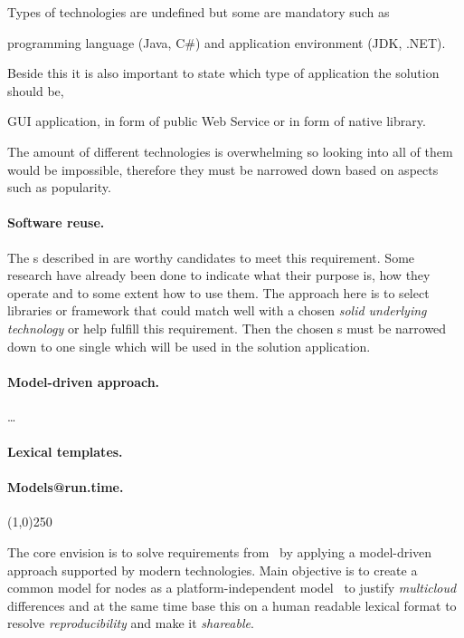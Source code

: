 Types of technologies are undefined but some are mandatory such as 
\begin{ii}
  \iitem programming language (Java, C\#) and 
  \iitem application environment (JDK, .NET).
\end{ii}
Beside this it is also important to state which type of application the solution should be, 
\begin{ii}
  \iitem GUI application,
  \iitem {} in form of public Web Service or
  \iitem {} in form of native library.
\end{ii}
The amount of different technologies is overwhelming so looking into all of them would be impossible,
therefore they must be narrowed down based on aspects such as popularity.

\paragraph{Software reuse.}
The s described in  are worthy candidates to meet this requirement.
Some research have already been done to indicate what their purpose is, 
how they operate and to some extent how to use them.
The approach here is to select libraries or framework that could match well with a chosen
\emph{solid underlying technology} or help fulfill this requirement.
Then the chosen s must be narrowed down to one single  which will be
used in the solution application.

\paragraph{Model-driven approach.}
\ldots
\paragraph{Lexical templates.}
\paragraph{Models@run.time.}

\begin{center}
\line(1,0){250}
\end{center}

The core envision is to solve requirements from~ by applying a 
model-driven approach supported by modern technologies.
Main objective is to create a common model for nodes as a platform-independent 
model~\cite{agile:cuong10}
to justify \emph{multicloud} differences and 
at the same time base this on a human readable lexical format to resolve \emph{reproducibility} and
make it \emph{shareable}.

